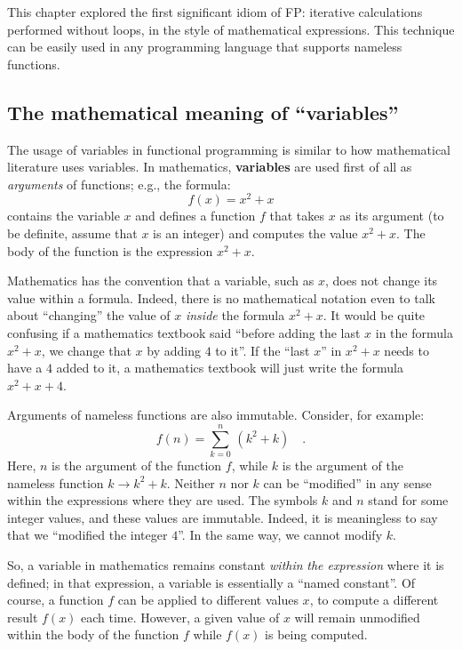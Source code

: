 This chapter explored the first significant idiom of FP: iterative
calculations performed without loops, in the style of mathematical
expressions. This technique can be easily used in any programming
language that supports nameless functions. 

\subsection{The mathematical meaning of \textquotedblleft variables\textquotedblright}

The usage of variables in functional programming is similar to how
mathematical literature uses variables. In mathematics, \textbf{variables}
are used first of all as \emph{arguments} of functions; e.g., the
formula:
\[
f(x)=x^{2}+x
\]
contains the variable $x$ and defines a function $f$ that takes
$x$ as its argument (to be definite, assume that $x$ is an integer)
and computes the value $x^{2}+x$. The body of the function is the
expression $x^{2}+x$. 

Mathematics has the convention that a variable, such as $x$, does
not change its value within a formula. Indeed, there is no mathematical
notation even to talk about \textsf{``}changing\textsf{''} the value of $x$ \emph{inside}
the formula $x^{2}+x$. It would be quite confusing if a mathematics
textbook said \textsf{``}before adding the last $x$ in the formula $x^{2}+x$,
we change that $x$ by adding $4$ to it\textsf{''}. If the \textsf{``}last $x$\textsf{''}
in $x^{2}+x$ needs to have a $4$ added to it, a mathematics textbook
will just write the formula $x^{2}+x+4$.

Arguments of nameless functions are also immutable. Consider, for
example:
\[
f(n)=\sum_{k=0}^{n}\,(k^{2}+k)\quad.
\]
Here, $n$ is the argument of the function $f$, while $k$ is the
argument of the nameless function $k\rightarrow k^{2}+k$. Neither
$n$ nor $k$ can be \textsf{``}modified\textsf{''} in any sense within the expressions
where they are used. The symbols $k$ and $n$ stand for some integer
values, and these values are immutable. Indeed, it is meaningless
to say that we \textsf{``}modified the integer $4$\textsf{''}. In the same way, we
cannot modify $k$.

So, a variable in mathematics remains constant \emph{within} \emph{the
expression} where it is defined; in that expression, a variable is
essentially a \textsf{``}named constant\textsf{''}. Of course, a function $f$ can
be applied to different values $x$, to compute a different result
$f(x)$ each time. However, a given value of $x$ will remain unmodified
within the body of the function $f$ while $f(x)$ is being computed.

